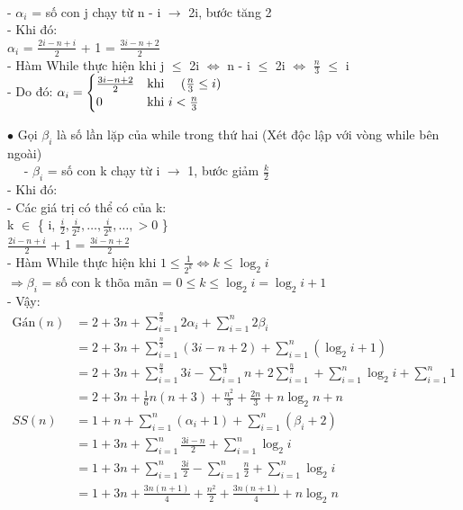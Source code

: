\documentclass[12pt, letterpaper]{article}
\begin{document}
	$\quad${ 
	- $\alpha_i$ = số con j chạy từ n - i $\rightarrow$ 2i, bước tăng 2 \\
	- Khi đó:\\
	$\alpha_i$ = $\frac{2i - n + i}{2}$ + 1 = $\frac{3i - n + 2}{2}$\\
	- Hàm While thực hiện khi j $\leq$ 2i $\Leftrightarrow$ n - i $\leq$ 2i $\Leftrightarrow$ $\frac{n}{3}$ $\leq$ i\\  
	- Do đó: $\alpha_i =
	\begin{cases}
	\frac{3i - n + 2}{2} &\text{khi } \quad (\frac{n}{3} \leq i)\\
	0 &\text{khi } i < \frac{n}{3}
	\end{cases} \\$

	$\bullet$ Gọi $\beta_i$ là số lần lặp của while trong thứ hai (Xét độc lập với vòng while bên ngoài)\\
	$\quad${ 
	- $\beta_i$ = số con k chạy từ i $\rightarrow$ 1, bước giảm $\frac{k}{2}$  \\
	- Khi đó:\\
	- Các giá trị có thể có của k: \\
     k $\in$ \{ i, $\frac{i}{2}, \frac{i}{2^2}, \ldots, \frac{i}{2^k}, \ldots, >0$ \} \\  $\frac{2i - n + i}{2}$ + 1 = $\frac{3i - n + 2}{2}$\\
	- Hàm While thực hiện khi $1 \leq \frac{1}{2^k}  \Leftrightarrow k \leq \log_2 i$\\  
	$\Rightarrow \beta_i$ = số \space con k thõa mãn = $0 \leq k \leq \log_2 i = \log_2 i+1$\\
	- Vậy: \\
	$ \begin{aligned}
		\text{Gán}(n) & = 2 + 3n + \sum^{\frac{n}{3} }_{i = 1} 2 \alpha_i  + \sum^{n}_{i = 1} 2 \beta_i\\
		& = 2 + 3n + \sum^{\frac{n}{3} }_{i = 1} (3i -n + 2) + \sum^{n}_{i = 1}(\log_2 i+1)\\
			& = 2 + 3n + \sum^{\frac{n}{3} }_{i = 1} 3i - \sum^{\frac{n}{3} }_{i = 1}n + 2\sum^{\frac{n}{3} }_{i = 1}  + \sum^{n}_{i = 1}\log_2 i+\sum^{n}_{i = 1}1\\
			& = 2 + 3n + \frac{1}{6}n(n+3) + \frac{n^2}{3} +\frac{2n}{3} + n\log_2n + n\
			\\SS(n) & = 1 + n + \sum^{n}_{i = 1} (\alpha_i  + 1) + \sum^{n}_{i = 1} ( \beta_i + 2)\\
			& = 1 + 3n + \sum^{n}_{i = 1} \frac{3i - n}{2} + \sum^{n}_{i = 1}\log_2 i\\
			& = 1 + 3n + \sum^{n}_{i = 1} \frac{3i}{2} - \sum^{n}_{i = 1} \frac{n}{2}+\sum^{n}_{i = 1}\log_2 i\\
			& = 1 + 3n + \frac{3n(n+1)}{4}+ \frac{n^2}{2}+ \frac{3n(n+1)}{4} + n\log_2n\\
	\end{aligned} $ \\
}}
\end{document}

